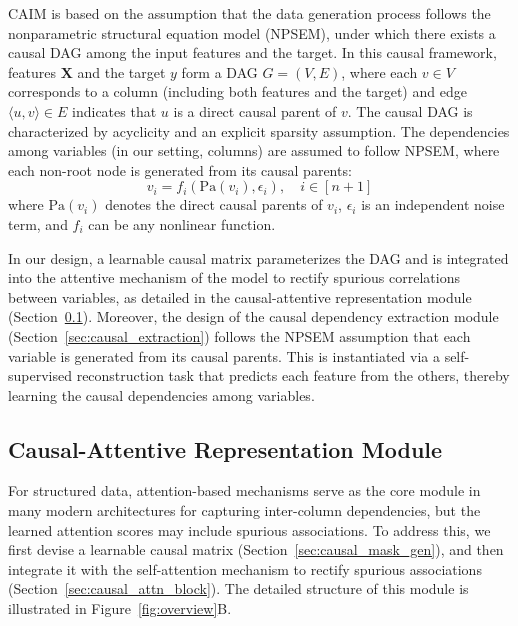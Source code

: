 \documentclass[sigconf, nonacm]{acmart}
\newcommand{\icde}[1]{{\color{black}#1}}
\newcommand{\rl}[1]{{\color{black}#1}}
\newcommand{\rln}[1]{{\color{black}#1}}
\newcommand{\sytwo}[1]{{\color{black}#1}}
\newcommand{\rlend}[1]{{\color{black}#1}}
\newcommand{\syend}[1]{{\color{black}#1}}
\newcommand{\syadd}[1]{{\color{black}#1}}
\newcommand{\syfix}[1]{{\color{black}#1}}
\newcommand{\syne}[1]{{\color{black}#1}}
\newcommand{\vldb}[1]{{\color{red}#1}}
\newcommand*{\ourmodel}{CAIM}
\begin{document}
\sytwo{\ourmodel{}} is based on the assumption that \syadd{the data generation process follows the nonparametric structural equation model (NPSEM), under which there exists a causal DAG} among the input features and the target\cite{r:pearl2009,r:peters2017}. 
In this causal framework, features $\mathbf{X}$ and the target $y$ form a DAG $G = (V, E)$, where each $v \in V$ corresponds to a column \sytwo{(including both features and the target)} and edge $\langle u, v \rangle \in E$ indicates that $u$ is a direct causal parent of $v$. \rl{The causal DAG is characterized by acyclicity and \syadd{an explicit sparsity assumption.}} 
The dependencies among \syfix{variables (in our setting, columns)} 
are assumed to follow NPSEM\cite{r:pearl2009}, where each non-root node is generated from its causal parents:
\begin{equation}
    v_i = f_i(\mathrm{Pa}(v_i), \epsilon_i), \quad i \in [n+1]
    \label{eq:structural-eq}
\end{equation}
where $\mathrm{Pa}(v_i)$ denotes the direct causal parents of $v_i$, $\epsilon_i$ is an independent noise term, and $f_i$ can be any nonlinear function.

\rln{
In our design, \syend{a learnable causal matrix parameterizes the DAG and} is \syend{integrated} into the attentive mechanism of the model to rectify spurious correlations between \syne{variables}, \syend{as detailed }in \vldb{the causal-attentive representation module (Section~\ref{sec:causal_attentive}).}
Moreover, the design of the causal dependency extraction module (Section~\sytwo{\ref{sec:causal_extraction}) follows the NPSEM assumption that each variable is generated from its causal parents. \syadd{This is} instantiated via a self-supervised reconstruction task \syadd{that predicts each feature from the others, thereby learning the causal dependencies among \syne{variables}.}
}
}

\subsection{Causal-Attentive Representation Module}\label{sec:causal_attentive}

\rlend{For structured data, attention-based mechanisms serve as the core module in many modern architectures for capturing inter-column dependencies\cite{r:autoint, r:tabm}, but the learned attention scores may include spurious associations.} \rln{To address this, we first devise a learnable causal matrix (Section~\ref{sec:causal_mask_gen}), 
and then integrate it with the self-attention mechanism to rectify spurious associations (Section~\ref{sec:causal_attn_block}). }\syend{ The detailed structure of this module is illustrated in Figure~\ref{fig:overview}B.}
\end{document}
